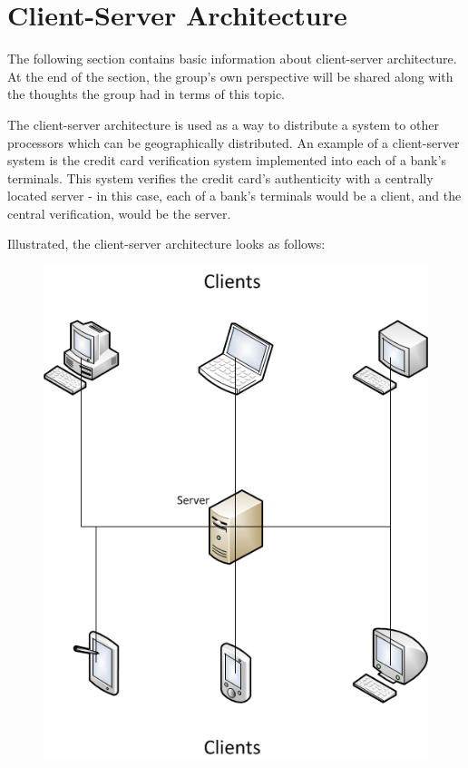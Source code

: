 \section{Client-Server Architecture}

The following section contains basic information about client-server architecture. At the 
end of the section, the group's own perspective will be shared along with the thoughts the 
group had in terms of this topic.

The client-server architecture is used as a way to distribute a system to other processors
which can be geographically distributed\cite{ooad01}. An example of a client-server system is the 
credit card verification system implemented into each of a bank's terminals. This system 
verifies the credit card's authenticity with a centrally located server - in this case, each 
of a bank's terminals would be a client, and the central verification, would be the 
server\cite{ooad01}.

Illustrated, the client-server architecture looks as follows:

\begin{figure}[ht]
	\centering
		\includegraphics[scale=0.50]{design/figures/client-server.png}
	\label{fig:client-server architecture}
\end{figure}

